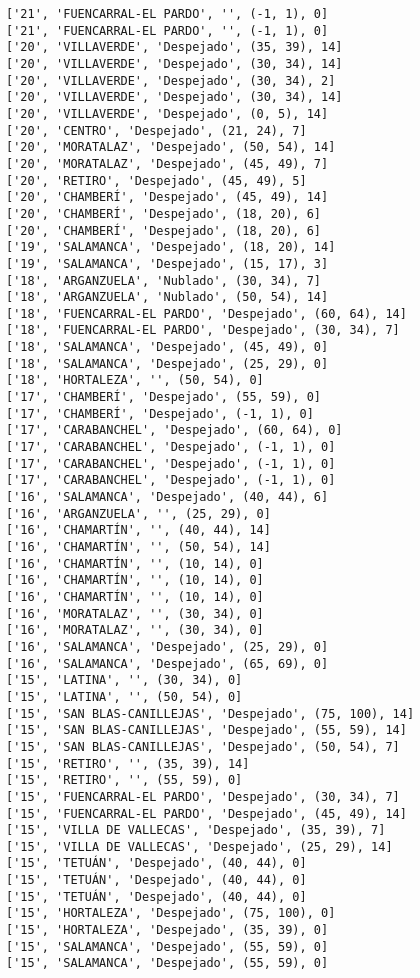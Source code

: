 \documentclass[11pt]{article}
\begin{document}
\begin{Verbatim}[commandchars=\\\{\}]
['21', 'FUENCARRAL-EL PARDO', '', (-1, 1), 0]
['21', 'FUENCARRAL-EL PARDO', '', (-1, 1), 0]
['20', 'VILLAVERDE', 'Despejado', (35, 39), 14]
['20', 'VILLAVERDE', 'Despejado', (30, 34), 14]
['20', 'VILLAVERDE', 'Despejado', (30, 34), 2]
['20', 'VILLAVERDE', 'Despejado', (30, 34), 14]
['20', 'VILLAVERDE', 'Despejado', (0, 5), 14]
['20', 'CENTRO', 'Despejado', (21, 24), 7]
['20', 'MORATALAZ', 'Despejado', (50, 54), 14]
['20', 'MORATALAZ', 'Despejado', (45, 49), 7]
['20', 'RETIRO', 'Despejado', (45, 49), 5]
['20', 'CHAMBERÍ', 'Despejado', (45, 49), 14]
['20', 'CHAMBERÍ', 'Despejado', (18, 20), 6]
['20', 'CHAMBERÍ', 'Despejado', (18, 20), 6]
['19', 'SALAMANCA', 'Despejado', (18, 20), 14]
['19', 'SALAMANCA', 'Despejado', (15, 17), 3]
['18', 'ARGANZUELA', 'Nublado', (30, 34), 7]
['18', 'ARGANZUELA', 'Nublado', (50, 54), 14]
['18', 'FUENCARRAL-EL PARDO', 'Despejado', (60, 64), 14]
['18', 'FUENCARRAL-EL PARDO', 'Despejado', (30, 34), 7]
['18', 'SALAMANCA', 'Despejado', (45, 49), 0]
['18', 'SALAMANCA', 'Despejado', (25, 29), 0]
['18', 'HORTALEZA', '', (50, 54), 0]
['17', 'CHAMBERÍ', 'Despejado', (55, 59), 0]
['17', 'CHAMBERÍ', 'Despejado', (-1, 1), 0]
['17', 'CARABANCHEL', 'Despejado', (60, 64), 0]
['17', 'CARABANCHEL', 'Despejado', (-1, 1), 0]
['17', 'CARABANCHEL', 'Despejado', (-1, 1), 0]
['17', 'CARABANCHEL', 'Despejado', (-1, 1), 0]
['16', 'SALAMANCA', 'Despejado', (40, 44), 6]
['16', 'ARGANZUELA', '', (25, 29), 0]
['16', 'CHAMARTÍN', '', (40, 44), 14]
['16', 'CHAMARTÍN', '', (50, 54), 14]
['16', 'CHAMARTÍN', '', (10, 14), 0]
['16', 'CHAMARTÍN', '', (10, 14), 0]
['16', 'CHAMARTÍN', '', (10, 14), 0]
['16', 'MORATALAZ', '', (30, 34), 0]
['16', 'MORATALAZ', '', (30, 34), 0]
['16', 'SALAMANCA', 'Despejado', (25, 29), 0]
['16', 'SALAMANCA', 'Despejado', (65, 69), 0]
['15', 'LATINA', '', (30, 34), 0]
['15', 'LATINA', '', (50, 54), 0]
['15', 'SAN BLAS-CANILLEJAS', 'Despejado', (75, 100), 14]
['15', 'SAN BLAS-CANILLEJAS', 'Despejado', (55, 59), 14]
['15', 'SAN BLAS-CANILLEJAS', 'Despejado', (50, 54), 7]
['15', 'RETIRO', '', (35, 39), 14]
['15', 'RETIRO', '', (55, 59), 0]
['15', 'FUENCARRAL-EL PARDO', 'Despejado', (30, 34), 7]
['15', 'FUENCARRAL-EL PARDO', 'Despejado', (45, 49), 14]
['15', 'VILLA DE VALLECAS', 'Despejado', (35, 39), 7]
['15', 'VILLA DE VALLECAS', 'Despejado', (25, 29), 14]
['15', 'TETUÁN', 'Despejado', (40, 44), 0]
['15', 'TETUÁN', 'Despejado', (40, 44), 0]
['15', 'TETUÁN', 'Despejado', (40, 44), 0]
['15', 'HORTALEZA', 'Despejado', (75, 100), 0]
['15', 'HORTALEZA', 'Despejado', (35, 39), 0]
['15', 'SALAMANCA', 'Despejado', (55, 59), 0]
['15', 'SALAMANCA', 'Despejado', (55, 59), 0]

\end{Verbatim}
\end{document}

